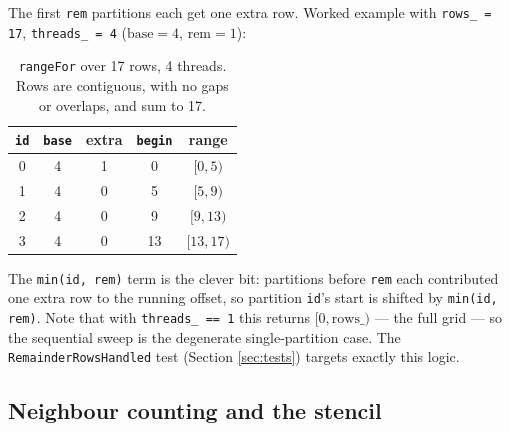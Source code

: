 \documentclass[
	english,
	letterpaper, oneside
]{article}
\begin{document}
The first \texttt{rem} partitions each get one extra row. Worked example with
\texttt{rows\_ = 17}, \texttt{threads\_ = 4} ($\text{base}=4$, $\text{rem}=1$):

\begin{table}[H]
	\centering
	\caption{\texttt{rangeFor} over 17 rows, 4 threads. Rows are contiguous,
	with no gaps or overlaps, and sum to 17.}
	\label{tab:rangefor}
	\begin{tabular}{@{}ccccc@{}}
		\toprule
		\texttt{id} & \texttt{base} & extra & \texttt{begin} & range \\
		\midrule
		0 & 4 & 1 & 0  & $[0,5)$ \\
		1 & 4 & 0 & 5  & $[5,9)$ \\
		2 & 4 & 0 & 9  & $[9,13)$ \\
		3 & 4 & 0 & 13 & $[13,17)$ \\
		\bottomrule
	\end{tabular}
\end{table}

The \texttt{min(id, rem)} term is the clever bit: partitions before \texttt{rem}
each contributed one extra row to the running offset, so partition \texttt{id}'s
start is shifted by \texttt{min(id, rem)}. Note that with \texttt{threads\_ == 1}
this returns $[0, \text{rows\_})$ --- the full grid --- so the sequential sweep is
the degenerate single-partition case. The \texttt{RemainderRowsHandled} test
(Section \ref{sec:tests}) targets exactly this logic.

\subsection{Neighbour counting and the stencil}
\end{document}
